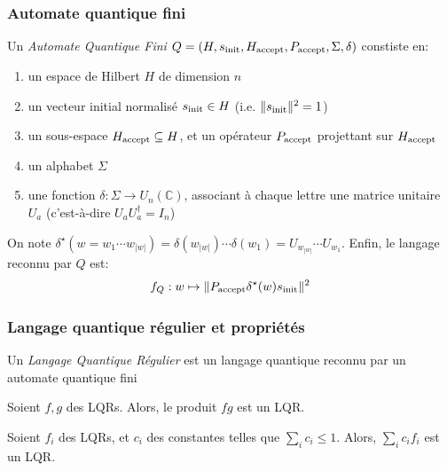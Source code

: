 \documentclass[aspectratio=169]{beamer}
\theoremstyle{plain}
\theoremstyle{definition}
\begin{document}
\begin{frame}
    \frametitle{Automate quantique fini}
    \begin{definition}[AQF]
        Un \emph{Automate Quantique Fini} $Q=(H, s_{\textnormal{init}}, H_{\textnormal{accept}}, P_{\textnormal{accept}}, \Sigma, \delta)$ constiste en:
        \begin{enumerate}[label=--, noitemsep]
            \item un espace de Hilbert $H$ de dimension $n$
            \item un vecteur initial normalisé $s_{\textnormal{init}}\in H$ (i.e. $\|s_{\textnormal{init}}\|^2=1$)
            \item un sous-espace $H_{\textnormal{accept}} \subseteq H$, et un opérateur $P_{\textnormal{accept}}$ projettant sur $H_{\textnormal{accept}}$
            \item un alphabet $\Sigma$
            \item une fonction $\delta : \Sigma \to U_n(\mathbb{C})$, associant à chaque lettre une matrice unitaire $U_a$ (c'est-à-dire $U_aU_a^\dagger = I_n$)
        \end{enumerate}
        
        On note $\delta^\star(w=w_1\cdots w_{|w|}) = \delta(w_{|w|})\cdots \delta(w_1) = U_{w_{|w|}}\cdots U_{w_1}$. Enfin, le langage reconnu par $Q$ est:
        \begin{equation*}
            f_Q : w \mapsto \|P_{\textnormal{accept}}\delta^\star(w)s_{\textnormal{init}}\|^2
        \end{equation*}
    \end{definition}
\end{frame}

\begin{frame}
    \frametitle{Langage quantique régulier et propriétés}
    \begin{definition}[LQR]
        Un \emph{Langage Quantique Régulier} est un langage quantique reconnu par un automate quantique fini
    \end{definition}

    \begin{theorem}
        Soient $f, g$ des LQRs. Alors, le produit $fg$ est un LQR.
    \end{theorem}

    \begin{theorem}
        Soient $f_i$ des LQRs, et $c_i$ des constantes telles que $\sum_i c_i \leq 1$. Alors, $\sum_i c_if_i$ est un LQR.
    \end{theorem}
\end{frame}
\end{document}
